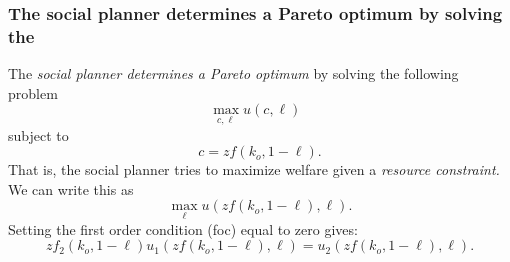 \documentclass[aspectratio=169]{ltx-talk}
\begin{document}
\begin{frame}
\frametitle{The social planner determines a Pareto optimum by solving the}
The \textit{social planner determines a Pareto optimum }by solving the
following problem%
\begin{equation*}
\underset{c,\ell }{\max }u(c,\ell )\text{ }
\end{equation*}%
subject to%
\begin{equation*}
c=zf\left( k_{o},1-\ell \right) .
\end{equation*}%
That is, the social planner tries to maximize welfare given a \textit{%
resource constraint. }We can write this as 
\begin{equation*}
\underset{\ell }{\max }u(zf\left( k_{o},1-\ell \right) ,\ell )\text{.}
\end{equation*}%
Setting the first order condition (foc) equal to zero gives:%
\begin{equation*}
zf_{2}\left( k_{o},1-\ell \right) u_{1}(zf\left( k_{o},1-\ell \right) ,\ell
)=u_{2}(zf\left( k_{o},1-\ell \right) ,\ell ).
\end{equation*}%
\end{frame}
\end{document}
